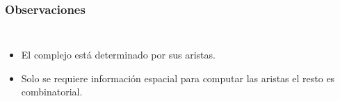 \documentclass{beamer}
\begin{document}
\begin{frame}\frametitle{Observaciones}
\begin{columns}
  \begin{itemize}
    \item<1-> El complejo está determinado por sus aristas.
    \begin{center}
    \end{center}
    
    \item<2-> Solo se requiere información espacial para computar las aristas
      el resto es combinatorial.
  \end{itemize}


\end{columns}
\end{frame}
\end{document}

